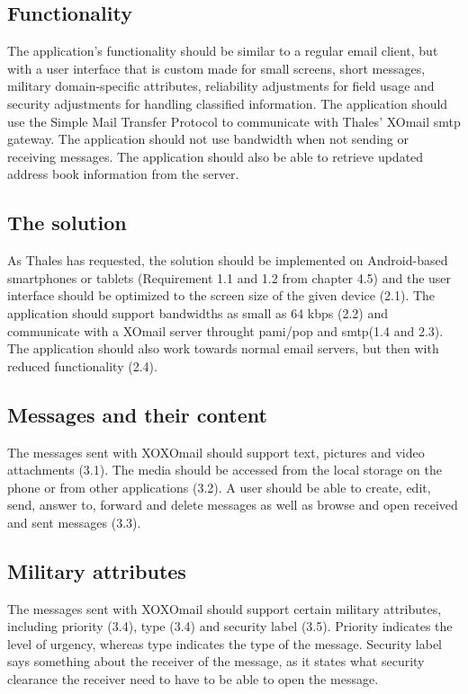 \subsection{Functionality}
The application's functionality should be similar to a regular email client, but with a user interface that is custom made for small screens, short messages, military domain-specific attributes, reliability adjustments for field usage and security adjustments for handling classified information. The application should use the Simple Mail Transfer Protocol to communicate with Thales' XOmail \gls{smtp} gateway.
\newline
\newline
The application should not use bandwidth when not sending or receiving messages. The application should also be able to retrieve updated address book information from the server.

\subsection{The solution}
As Thales has requested, the solution should be implemented on Android-based smartphones or tablets (Requirement 1.1 and 1.2 from chapter 4.5) and the user interface should be optimized to the screen size of the given device (2.1). The application should support bandwidths as small as 64 kbps (2.2) and communicate with a XOmail server throught \gls{pami}/\gls{pop} and \gls{smtp}(1.4 and 2.3). The application should also work towards normal email servers, but then with reduced functionality (2.4).

\subsection{Messages and their content}
The messages sent with XOXOmail should support text, pictures and video attachments (3.1). The media should be accessed from the local storage on the phone or from other applications (3.2). A user should be able to create, edit, send, answer to, forward and delete messages as well as browse and open received and sent messages (3.3).

\subsection{Military attributes}
The messages sent with XOXOmail should support certain military attributes, including priority (3.4), type (3.4) and security label (3.5). Priority indicates the level of urgency, whereas type indicates the type of the message. Security label says something about the receiver of the message, as it states what security clearance the receiver need to have to be able to open the message.

